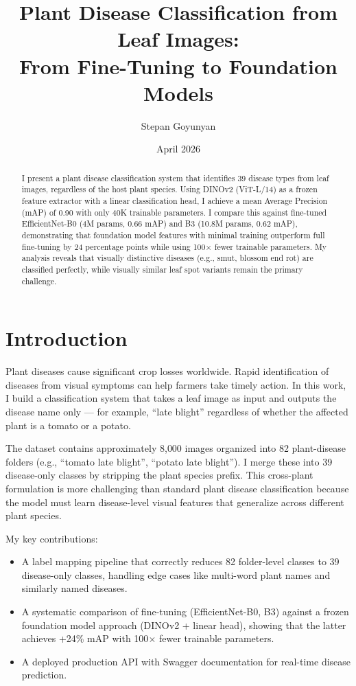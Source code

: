 \documentclass[11pt, a4paper]{article}
\title{Plant Disease Classification from Leaf Images:\\From Fine-Tuning to Foundation Models}
\author{Stepan Goyunyan}
\date{April 2026}
\begin{document}
\maketitle

\begin{abstract}
I present a plant disease classification system that identifies 39 disease types from leaf images, regardless of the host plant species. Using DINOv2 (ViT-L/14) as a frozen feature extractor with a linear classification head, I achieve a mean Average Precision (mAP) of 0.90 with only 40K trainable parameters. I compare this against fine-tuned EfficientNet-B0 (4M params, 0.66 mAP) and B3 (10.8M params, 0.62 mAP), demonstrating that foundation model features with minimal training outperform full fine-tuning by 24 percentage points while using 100$\times$ fewer trainable parameters. My analysis reveals that visually distinctive diseases (e.g., smut, blossom end rot) are classified perfectly, while visually similar leaf spot variants remain the primary challenge.
\end{abstract}

\section{Introduction}

Plant diseases cause significant crop losses worldwide. Rapid identification of diseases from visual symptoms can help farmers take timely action. In this work, I build a classification system that takes a leaf image as input and outputs the disease name only --- for example, ``late blight'' regardless of whether the affected plant is a tomato or a potato.

The dataset contains approximately 8{,}000 images organized into 82 plant-disease folders (e.g., ``tomato late blight'', ``potato late blight''). I merge these into 39 disease-only classes by stripping the plant species prefix. This cross-plant formulation is more challenging than standard plant disease classification because the model must learn disease-level visual features that generalize across different plant species.

My key contributions:
\begin{itemize}
    \item A label mapping pipeline that correctly reduces 82 folder-level classes to 39 disease-only classes, handling edge cases like multi-word plant names and similarly named diseases.
    \item A systematic comparison of fine-tuning (EfficientNet-B0, B3) against a frozen foundation model approach (DINOv2 + linear head), showing that the latter achieves +24\% mAP with 100$\times$ fewer trainable parameters.
    \item A deployed production API with Swagger documentation for real-time disease prediction.
\end{itemize}
\end{document}
